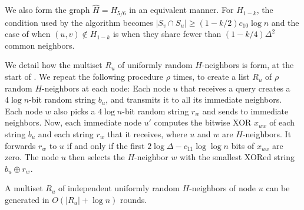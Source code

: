 We also form the graph $\hat{H} = H_{5/6}$ in an equivalent manner.
For $H_{1-k}$, the condition used by the algorithm becomes $|S_v \cap S_u| \ge (1-k/2)c_{10} \log n$ and the case of when $(u,v) \not\in H_{1-k}$ is when they share fewer than $(1-k/4)\Delta^2$ common neighbors.

%
We detail how the multiset $R_u$ of uniformly random $H$-neighbors is form, at the start of .
We repeat the following procedure $\rho$ times, to create a list $R_u$ of $\rho$ random $H$-neighbors at each node:
Each node $u$ that receives a query creates a $4\log n$-bit random string $b_u$, and transmits it to all its immediate neighbors. Each node $w$ also picks a $4\log n$-bit random string $r_w$ and sends to immediate neighbors. Now, each immediate node $u'$ computes the bitwise XOR $x_{uw}$ of each string $b_u$ and each string $r_w$ that it receives, where $u$ and $w$ are $H$-neighbors. It forwards $r_w$ to $u$ if and only if the first $2\log \Delta - c_{11} \log\log n$ bits of $x_{uw}$ are zero. 
The node $u$ then selects the $H$-neighbor $w$ with the smallest XORed string $b_u \oplus r_w$. 


\begin{lemma}
A multiset $R_u$ of independent uniformly random $H$-neighbors of node $u$ can be generated in $O(|R_u|+\log n)$ rounds. 
\label{L:rand-nbor}
\end{lemma}
\iffalse %
\begin{proof}
Each d2-neighbor's string $r_w$ gets forwarded (by $u'$) with probability $2^{c_{11}}\log n / \Delta^2$. Thus, the number  $y_{u}$ of strings that get forwarded to $u$ is expected $E[y_u] = 2^{c_{11}} \log n$. Setting $c_{11} \ge \max(4, 1+\log c_3)$.
By Chernoff (\ref{eq:chernoff-lower}), $u$ receives at least $2^{c_{11}-1} \log n \ge c_3 \log n$ strings with probability $1-1/n^2$.
Thus, with probability at least $1-1/n$, all nodes receive at least $c_3 \log n$ strings.
Hence, the node $u$ will correctly identify the $H$-neighbor whose bitstrings have the smallest XOR with its random string, which gives a uniformly random sampling.
The probability that some pair of nodes receive the same bitstring is at most $2^{-4\log n} = n^{-4}$. Thus, with probability at least $1-1/n^2$, there is always a unique node with the smallest XORed string.

Independence follows because a collection $\{r_w\}_w$ of uniformly random bitstrings that is XORed with a particular (not necessarily random) bitstring $b_u$ forming collection $\{ b_u \oplus r_w\}_w$ stays uniformly random.
The same holds then for the collection of strings $\{b_u\}_u$
that is XORed with a string $r_w$ of a fixed node.
\end{proof}
\fi %

